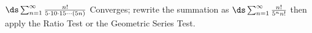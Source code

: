 {$\ds\sum_{n=1}^\infty \frac{n!}{5\cdot10\cdot15\cdots (5n)}$
}
{Converges; rewrite the summation as $\ds\sum_{n=1}^\infty \frac{n!}{5^nn!}$ then apply the Ratio Test or the Geometric Series Test.
}